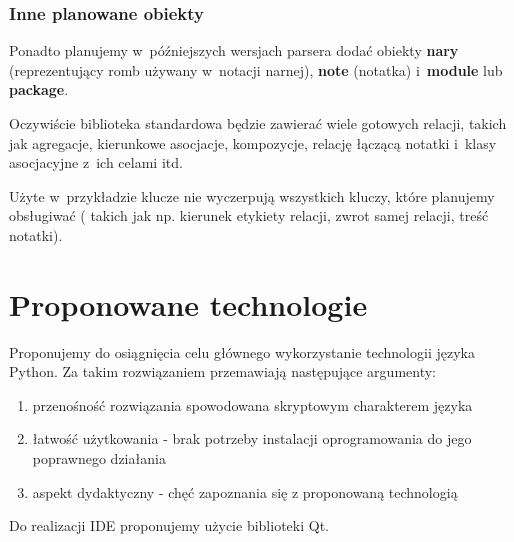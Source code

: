 \documentclass[a4paper,11pt]{article}
\begin{document}
\subsubsection{Inne planowane obiekty}
Ponadto planujemy w~późniejszych wersjach parsera dodać obiekty \textbf{n\dywiz ary} (reprezentujący
romb używany w~notacji n\dywiz arnej), \textbf{note} (notatka) i~\textbf{module} lub
\textbf{package}.

Oczywiście biblioteka standardowa będzie zawierać wiele gotowych relacji, takich jak agregacje,
kierunkowe asocjacje, kompozycje, relację łączącą notatki i~klasy asocjacyjne z~ich celami itd.

Użyte w~przykładzie klucze nie wyczerpują wszystkich kluczy, które planujemy obsługiwać ( takich jak
np. kierunek etykiety relacji, zwrot samej relacji, treść notatki).


\section{Proponowane technologie}
Proponujemy do osiągnięcia celu głównego wykorzystanie technologii języka Python. Za takim
rozwiązaniem przemawiają następujące argumenty:
\begin{enumerate}
  \item{przenośność rozwiązania spowodowana skryptowym charakterem języka}
  \item{łatwość użytkowania - brak potrzeby instalacji oprogramowania do jego poprawnego działania}
  \item{aspekt dydaktyczny - chęć zapoznania się z proponowaną technologią}
\end{enumerate}
Do realizacji IDE proponujemy użycie biblioteki Qt.
\end{document}
